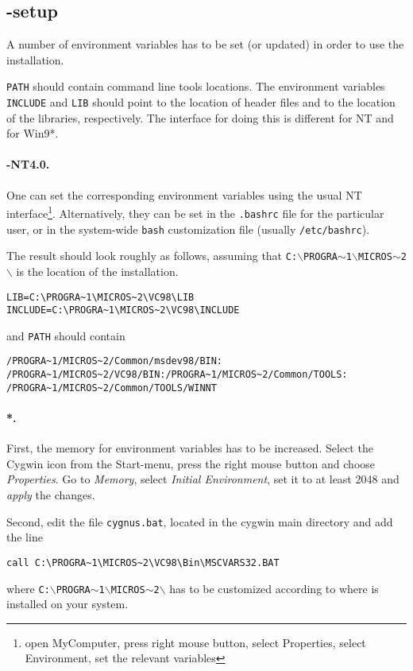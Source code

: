\subsection{-setup}
A number of environment variables has to be set (or updated)
in order to use the installation.

\texttt{PATH} should contain  command line tools locations.
The environment variables \texttt{INCLUDE} and \texttt{LIB} should
point to the location of  header files and to the location
of the  libraries, respectively.
The interface for doing this is different for NT and for Win9*.

\paragraph{\mswin-NT4.0.}
One can set the corresponding environment variables using the
usual NT interface\footnote{open MyComputer, press right mouse button,
  select Properties, select Environment, set the relevant variables}.
Alternatively, they can be set in the \texttt{.bashrc} file for the
particular user, or in the system-wide \texttt{bash} customization
file (usually \texttt{/etc/bashrc}).

The result should look roughly as follows, assuming that
\texttt{C:$\backslash$PROGRA$\sim$1$\backslash$MICROS$\sim$2$\backslash$}
is the location of the \msvc{} installation.
\begin{verbatim}
LIB=C:\PROGRA~1\MICROS~2\VC98\LIB
INCLUDE=C:\PROGRA~1\MICROS~2\VC98\INCLUDE
\end{verbatim}
and \texttt{PATH} should contain
\begin{verbatim}
/PROGRA~1/MICROS~2/Common/msdev98/BIN:
/PROGRA~1/MICROS~2/VC98/BIN:/PROGRA~1/MICROS~2/Common/TOOLS:
/PROGRA~1/MICROS~2/Common/TOOLS/WINNT
\end{verbatim}

\paragraph{*.} 
First, the memory for environment variables has to be increased.
Select the Cygwin icon from the Start-menu, press the right mouse
button and choose \textit{Properties}. Go to \textit{Memory}, select
\textit{Initial Environment}, set it to at least 2048 and
\textit{apply} the changes.

Second, edit the file \texttt{cygnus.bat}, located in the cygwin main
directory and add the line
\begin{verbatim}
call C:\PROGRA~1\MICROS~2\VC98\Bin\MSCVARS32.BAT
\end{verbatim}
where
\texttt{C:$\backslash$PROGRA$\sim$1$\backslash$MICROS$\sim$2$\backslash$}
has to be customized according to where \msvc{} is installed on your
system.

